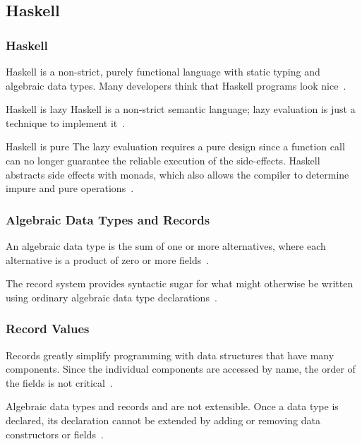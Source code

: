 \subsection{Haskell}
\begin{frame}\frametitle{Haskell}

Haskell is a non-strict, purely functional language with static typing and algebraic data types. Many developers think that Haskell programs look nice~\cite{history-of-haskell}.

\begin{block}{Haskell is lazy}
    Haskell is a non-strict semantic language; lazy evaluation is just a technique to implement it~\cite{history-of-haskell}.
\end{block}

\begin{block}{Haskell is pure}
The lazy evaluation requires a pure design since a function call can no longer guarantee the reliable execution of the side-effects. Haskell abstracts side effects with monads, which also allows the compiler to determine impure and pure operations~\cite{history-of-haskell}.
\end{block}

\end{frame}

\begin{frame}\frametitle{Algebraic Data Types and Records}

An algebraic data type is the sum of one or more alternatives, where each alternative is a product of zero or more fields~\cite{history-of-haskell}. 
        

The record system provides syntactic sugar for what might otherwise be written using ordinary algebraic data type declarations~\cite{lw-ext-records}. 


\end{frame}

\begin{frame}\frametitle{Record Values}

Records greatly simplify programming with data structures that have many components. Since the individual components are accessed by name, the order of the fields is not critical~\cite{lw-ext-records}.


Algebraic data types and records and are not extensible. Once a data type is declared, its declaration cannot be extended by adding or removing data constructors or fields~\cite{hlist,lw-ext-records,trees-that-grow}. 

\end{frame}

